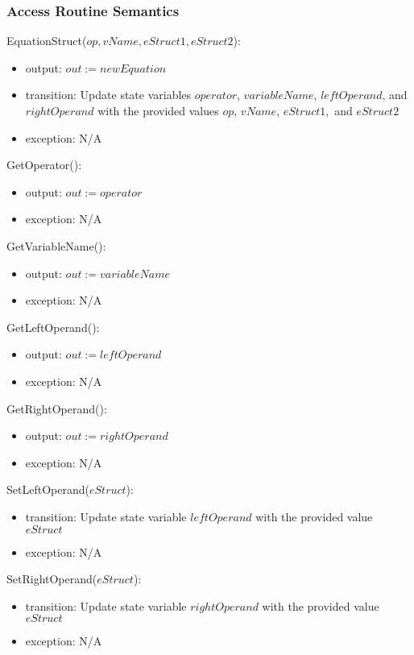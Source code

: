 \documentclass[12pt, titlepage]{article}
\begin{document}
\subsubsection{Access Routine Semantics}

\noindent EquationStruct($op, vName, eStruct1, eStruct2$):
\begin{itemize}
	\item output: $out := newEquation$
	\item transition: Update state variables $operator$, $variableName$, 
	$leftOperand$, and $rightOperand$ with the provided values $op$, $vName$, 
	$eStruct1,$ and $eStruct2$
	\item exception: N/A
\end{itemize}

\noindent GetOperator():
\begin{itemize}
	\item output: $out := operator$
	\item exception: N/A
\end{itemize}

\noindent GetVariableName():
\begin{itemize}
	\item output: $out := variableName$
	\item exception: N/A
\end{itemize}

\noindent GetLeftOperand():
\begin{itemize}
	\item output: $out := leftOperand$
	\item exception: N/A
\end{itemize}

\noindent GetRightOperand():
\begin{itemize}
	\item output: $out := rightOperand$
	\item exception: N/A
\end{itemize}

\noindent SetLeftOperand($eStruct$):
\begin{itemize}
	\item transition: Update state variable $leftOperand$ with the provided 
	value $eStruct$
	\item exception: N/A
\end{itemize}

\noindent SetRightOperand($eStruct$):
\begin{itemize}
	\item transition: Update state variable $rightOperand$ with the provided 
	value $eStruct$
	\item exception: N/A
\end{itemize}
\end{document}
